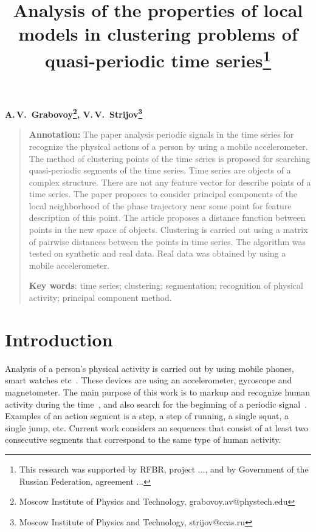 \documentclass[12pt, twoside]{article}
\numberwithin{equation}{section}
\begin{document}
\title{\bf Analysis of the properties of local models in clustering problems of quasi-periodic time series\thanks{This research was supported by RFBR, project ..., and by Government of the Russian Federation, agreement ...}}
\date{}
\author{}
\maketitle

\begin{center}
\bf
A.\,V.~Grabovoy\footnote{Moscow Institute of Physics and Technology, grabovoy.av@phystech.edu}, V.\,V.~Strijov\footnote{Moscow Institute of Physics and Technology, strijov@ccas.ru}

\end{center}

{\centering\begin{quote}
\textbf{Annotation:} The paper analysis periodic signals in the time series for recognize the physical actions of a person by using a mobile accelerometer. 
The method of clustering points of the time series is proposed for searching quasi-periodic segments of the time series. 
Time series are objects of a complex structure. 
There are not any feature vector for describe points of a time series. 
The paper proposes to consider principal components of the local neighborhood of the phase trajectory near some point for feature description of this point.
The article proposes a distance function between points in the new space of objects.
Clustering is carried out using a matrix of pairwise distances between the points in time series.
The algorithm was tested on synthetic and real data. Real data was obtained by using a mobile accelerometer.


\smallskip
\textbf{Key words}: time series; clustering; segmentation; recognition of physical activity; principal component method.

\smallskip
\end{quote}
}

\section{Introduction}
Analysis of a person’s physical activity is carried out by using mobile phones, smart watches etc~\cite{kwapisz2010, wang2014}.
These devices are using an accelerometer, gyroscope and magnetometer. 
The main purpose of this work is to markup and recognize human activity during the time~\cite{Ignatov2015, Olivares2012}, and also search for the beginning of a periodic signal~\cite{motrenko2015, cinar2018}.
Examples of an action segment is a step, a step of running, a single squat, a single jump, etc.
Current work considers an sequences  that consist of at least two consecutive segments that correspond to the same type of human activity.
\end{document}
